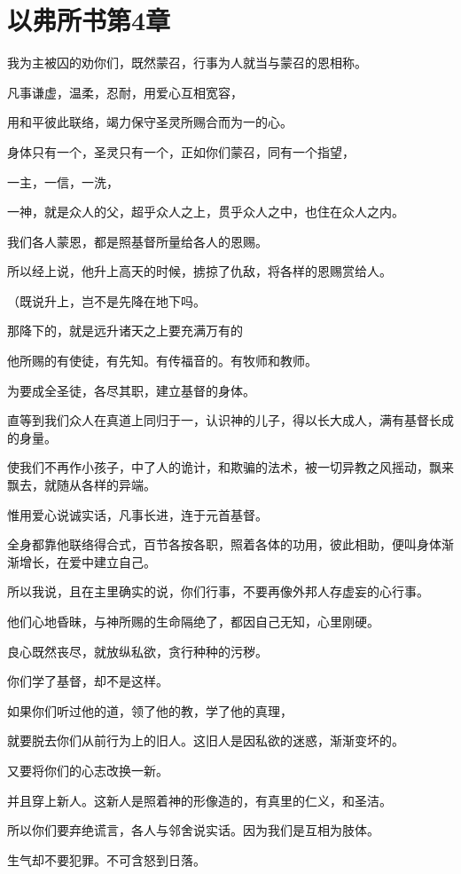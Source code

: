 \documentclass[12pt,oneside]{book}
\begin{document}
\chapter{以弗所书第4章}
我为主被囚的劝你们，既然蒙召，行事为人就当与蒙召的恩相称。

凡事谦虚，温柔，忍耐，用爱心互相宽容，

用和平彼此联络，竭力保守圣灵所赐合而为一的心。

身体只有一个，圣灵只有一个，正如你们蒙召，同有一个指望，

一主，一信，一洗，

一神，就是众人的父，超乎众人之上，贯乎众人之中，也住在众人之内。

我们各人蒙恩，都是照基督所量给各人的恩赐。

所以经上说，他升上高天的时候，掳掠了仇敌，将各样的恩赐赏给人。

（既说升上，岂不是先降在地下吗。

那降下的，就是远升诸天之上要充满万有的

他所赐的有使徒，有先知。有传福音的。有牧师和教师。

为要成全圣徒，各尽其职，建立基督的身体。

直等到我们众人在真道上同归于一，认识神的儿子，得以长大成人，满有基督长成的身量。

使我们不再作小孩子，中了人的诡计，和欺骗的法术，被一切异教之风摇动，飘来飘去，就随从各样的异端。

惟用爱心说诚实话，凡事长进，连于元首基督。

全身都靠他联络得合式，百节各按各职，照着各体的功用，彼此相助，便叫身体渐渐增长，在爱中建立自己。

所以我说，且在主里确实的说，你们行事，不要再像外邦人存虚妄的心行事。

他们心地昏昧，与神所赐的生命隔绝了，都因自己无知，心里刚硬。

良心既然丧尽，就放纵私欲，贪行种种的污秽。

你们学了基督，却不是这样。

如果你们听过他的道，领了他的教，学了他的真理，

就要脱去你们从前行为上的旧人。这旧人是因私欲的迷惑，渐渐变坏的。

又要将你们的心志改换一新。

并且穿上新人。这新人是照着神的形像造的，有真里的仁义，和圣洁。

所以你们要弃绝谎言，各人与邻舍说实话。因为我们是互相为肢体。

生气却不要犯罪。不可含怒到日落。
\end{document}
